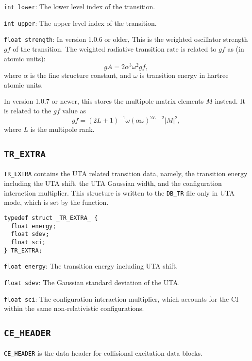 \begin{dbdesc}
\item[\texttt{int lower}:] The lower level index of the transition.
\item[\texttt{int upper}:] The upper level index of the transition.
\item[\texttt{float strength}:] In version 1.0.6 or older, This is the
  weighted oscillator strength $gf$ of the transition. The weighted radiative
  transition rate is related to $gf$ as (in atomic units):
\begin{equation}
gA = 2\alpha^3 \omega^2 gf,
\end{equation}
where $\alpha$ is the fine structure constant, and $\omega$ is transition
energy in hartree atomic units.

In version 1.0.7 or newer, this stores the multipole matrix elements $M$
instead. It is related to the $gf$ value as
\begin{equation}
gf =
\left(2L+1\right)^{-1}\omega\left(\alpha\omega\right)^{2L-2}\left|M\right|^2,
\end{equation}
where $L$ is the multipole rank.
\end{dbdesc}

\subsection{\texttt{TR\_EXTRA}}
\texttt{TR\_EXTRA} contains the UTA related transition data, namely, the
transition energy including the UTA shift, the UTA Gaussian width, and the
configuration interaction multiplier. This structure is written to the
\texttt{DB\_TR} file only in UTA mode, which is set by the 
function.

\begin{verbatim}
typedef struct _TR_EXTRA_ {
  float energy;
  float sdev;
  float sci;
} TR_EXTRA;
\end{verbatim}

\begin{dbdesc}
\item[\texttt{float energy}:] The transition energy including UTA shift.
\item[\texttt{float sdev}:] The Gaussian standard deviation of the UTA.
\item[\texttt{float sci}:] The configuration interaction multiplier, which
  accounts for the CI within the same non-relativistic configurations.
\end{dbdesc}

\subsection{\texttt{CE\_HEADER}}
\texttt{CE\_HEADER} is the data header for collisional excitation data blocks.

